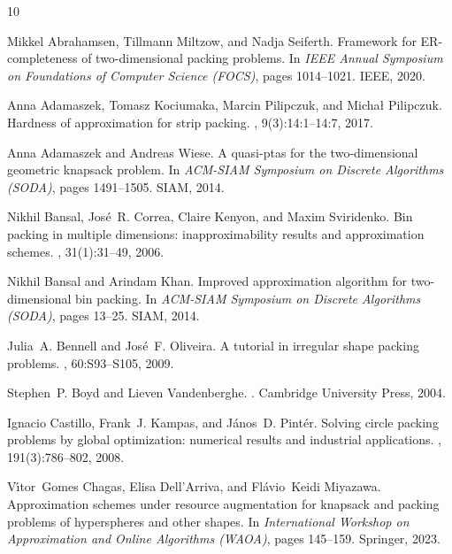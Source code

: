 \documentclass[10pt,a4paper]{article}
\theoremstyle{plain}
\theoremstyle{plain}
\theoremstyle{plain}
\theoremstyle{definition}
\begin{document}
{%
\begin{thebibliography}{10}

Mikkel Abrahamsen, Tillmann Miltzow, and Nadja Seiferth.
\newblock Framework for {ER}-completeness of two-dimensional packing problems.
\newblock In {\em IEEE Annual Symposium on Foundations of Computer Science (FOCS)}, pages 1014--1021. IEEE, 2020.

Anna Adamaszek, Tomasz Kociumaka, Marcin Pilipczuk, and Michał Pilipczuk.
\newblock Hardness of approximation for strip packing.
, 9(3):14:1--14:7, 2017.

Anna Adamaszek and Andreas Wiese.
\newblock A quasi-ptas for the two-dimensional geometric knapsack problem.
\newblock In {\em ACM-SIAM Symposium on Discrete Algorithms (SODA)}, pages 1491--1505. SIAM, 2014.

Nikhil Bansal, Jos{\'e}~R. Correa, Claire Kenyon, and Maxim Sviridenko.
\newblock Bin packing in multiple dimensions: inapproximability results and approximation schemes.
, 31(1):31--49, 2006.

Nikhil Bansal and Arindam Khan.
\newblock Improved approximation algorithm for two-dimensional bin packing.
\newblock In {\em ACM-SIAM Symposium on Discrete Algorithms (SODA)}, pages 13--25. SIAM, 2014.

Julia~A. Bennell and Jos{\'e}~F. Oliveira.
\newblock A tutorial in irregular shape packing problems.
, 60:S93--S105, 2009.

Stephen~P. Boyd and Lieven Vandenberghe.
.
\newblock Cambridge University Press, 2004.

Ignacio Castillo, Frank~J. Kampas, and J{\'a}nos~D. Pint{\'e}r.
\newblock Solving circle packing problems by global optimization: numerical results and industrial applications.
, 191(3):786--802, 2008.

V{\'{\i}}tor~Gomes Chagas, Elisa Dell'Arriva, and Fl{\'{a}}vio~Keidi Miyazawa.
\newblock Approximation schemes under resource augmentation for knapsack and packing problems of hyperspheres and other shapes.
\newblock In {\em International Workshop on Approximation and Online Algorithms (WAOA)}, pages 145--159. Springer, 2023.


\end{thebibliography}}
\end{document}
